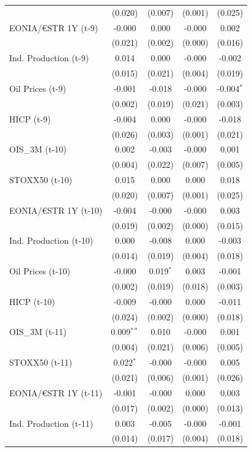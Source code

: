 \begin{longtable}[t]{lcccc}
 & (0.020) & (0.007) & (0.001) & \vphantom{1} (0.025)\\
EONIA/€STR 1Y (t-9) & -0.000 & 0.000 & -0.000 & 0.002\\
 & (0.021) & (0.002) & (0.000) & (0.016)\\
Ind. Production (t-9) & 0.014 & 0.000 & -0.000 & -0.002\\
 & (0.015) & (0.021) & (0.004) & (0.019)\\
Oil Prices (t-9) & -0.001 & -0.018 & -0.000 & -0.004$^{*}$\\
 & (0.002) & (0.019) & (0.021) & (0.003)\\
HICP (t-9) & -0.004 & 0.000 & -0.000 & -0.018\\
 & (0.026) & (0.003) & (0.001) & (0.021)\\
OIS\_3M (t-10) & 0.002 & -0.003 & -0.000 & 0.001\\
 & (0.004) & (0.022) & (0.007) & (0.005)\\
STOXX50 (t-10) & 0.015 & 0.000 & 0.000 & 0.018\\
 & (0.020) & (0.007) & (0.001) & (0.025)\\
EONIA/€STR 1Y (t-10) & -0.004 & -0.000 & -0.000 & 0.003\\
 & (0.019) & (0.002) & (0.000) & \vphantom{1} (0.015)\\
Ind. Production (t-10) & 0.000 & -0.008 & 0.000 & -0.003\\
 & (0.014) & (0.019) & (0.004) & (0.018)\\
Oil Prices (t-10) & -0.000 & 0.019$^{*}$ & 0.003 & -0.001\\
 & (0.002) & (0.019) & (0.018) & (0.003)\\
HICP (t-10) & -0.009 & -0.000 & 0.000 & -0.011\\
 & (0.024) & (0.002) & (0.000) & (0.018)\\
OIS\_3M (t-11) & 0.009$^{**}$ & 0.010 & -0.000 & 0.001\\
 & (0.004) & (0.021) & (0.006) & (0.005)\\
STOXX50 (t-11) & 0.022$^{*}$ & -0.000 & -0.000 & 0.005\\
 & (0.021) & (0.006) & (0.001) & (0.026)\\
EONIA/€STR 1Y (t-11) & -0.001 & -0.000 & 0.000 & 0.003\\
 & (0.017) & (0.002) & (0.000) & (0.013)\\
Ind. Production (t-11) & 0.003 & -0.005 & -0.000 & -0.001\\
 & (0.014) & (0.017) & (0.004) & (0.018)\\

\end{longtable}
